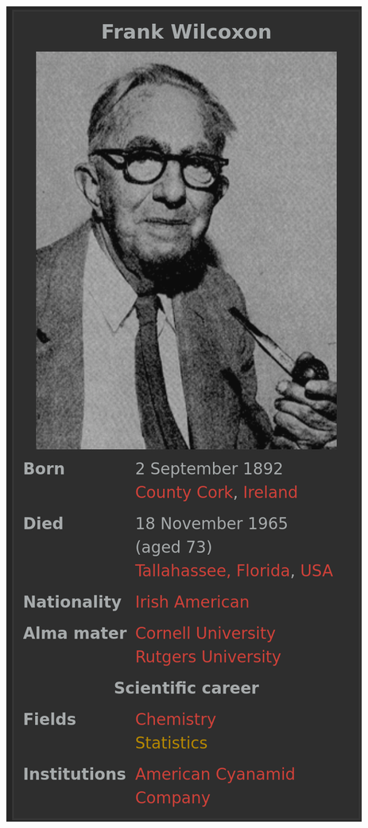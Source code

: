 \begin{frame}
\begin{center}
	\includegraphics[scale=0.15]{./Codes/Wilcoxon.png}
\end{center}
\end{frame}
